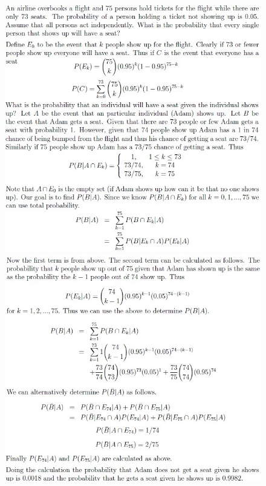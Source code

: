 \documentclass[11pt,landscape]{article}
\begin{document}
\begin{multicols}{3}
\begin{figure}[H]
\end{figure}
\begin{figure}[H]
    \includegraphics[scale=0.46]{./Images/Seat1.jpg}
    \includegraphics[scale=0.46]{./Images/Seat2.jpg}
\end{figure}
\begin{figure}[H]

\end{figure}
\end{multicols}
\end{document}
